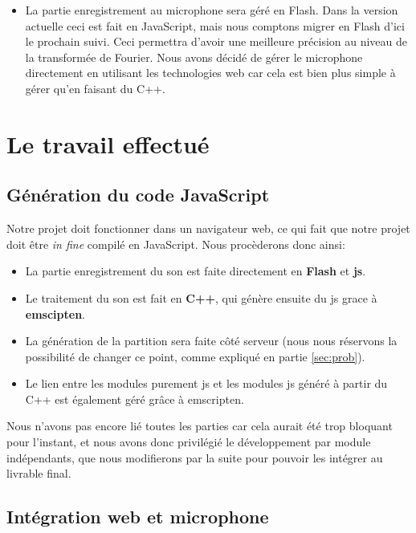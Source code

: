 \documentclass[12pt]{article}
\begin{document}
\begin{itemize}
\begin{enumerate}
\end{enumerate}

\item La partie enregistrement au microphone sera géré en Flash. Dans la version actuelle ceci est fait en JavaScript, mais nous comptons migrer en Flash d'ici le prochain suivi. Ceci permettra d'avoir une meilleure précision au niveau de la transformée de Fourier. Nous avons décidé de gérer le microphone directement en utilisant les technologies web car cela est bien plus simple à gérer qu'en faisant du C++.

\end{itemize}

\section{Le travail effectué}

\subsection{Génération du code JavaScript}

\par Notre projet doit fonctionner dans un navigateur web, ce qui fait que notre projet doit être \emph{in fine} compilé en JavaScript. Nous procèderons donc ainsi:
\begin{itemize}

\item La partie enregistrement du son est faite directement en \textbf{Flash} et \textbf{js}.
\item Le traitement du son est fait en \textbf{C++}, qui génère ensuite du js grace à \textbf{emscipten}.
\item La génération de la partition sera faite côté serveur (nous nous réservons la possibilité de changer ce point, comme expliqué en partie \ref{sec:prob}).
\item Le lien entre les modules purement js et les modules js généré à partir du C++ est également géré grâce à emscripten.

\end{itemize}

\par Nous n'avons pas encore lié toutes les parties car cela aurait été trop bloquant pour l'instant, et nous avons donc privilégié le développement par module indépendants, que nous modifierons par la suite pour pouvoir les intégrer au livrable final.

\subsection{Intégration web et microphone}
\end{document}
